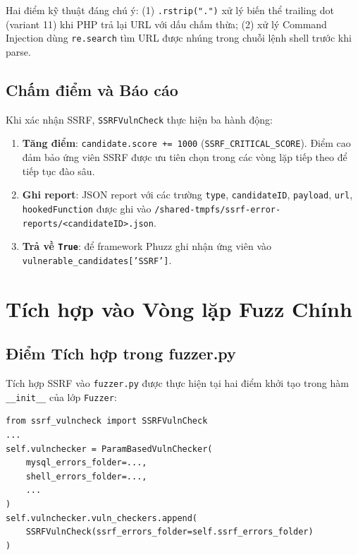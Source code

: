 Hai điểm kỹ thuật đáng chú ý: (1) \texttt{.rstrip(".")} xử lý biến thể
trailing dot (variant 11) khi PHP trả lại URL với dấu chấm thừa; (2) xử lý
Command Injection dùng \texttt{re.search} tìm URL được nhúng trong chuỗi
lệnh shell trước khi parse.

\subsection{Chấm điểm và Báo cáo}

Khi xác nhận SSRF, \texttt{SSRFVulnCheck} thực hiện ba hành động:

\begin{enumerate}
    \item \textbf{Tăng điểm}: \texttt{candidate.score += 1000}
    (\texttt{SSRF\_CRITICAL\_SCORE}). Điểm cao đảm bảo ứng viên SSRF được
    ưu tiên chọn trong các vòng lặp tiếp theo để tiếp tục đào sâu.
    \item \textbf{Ghi report}: JSON report với các trường \texttt{type},
    \texttt{candidateID}, \texttt{payload}, \texttt{url},
    \texttt{hookedFunction} được ghi vào
    \texttt{/shared-tmpfs/ssrf-error-reports/<candidateID>.json}.
    \item \textbf{Trả về \texttt{True}}: để framework Phuzz ghi nhận
    ứng viên vào \texttt{vulnerable\_candidates['SSRF']}.
\end{enumerate}

\section{Tích hợp vào Vòng lặp Fuzz Chính}
\label{sec:integration}

\subsection{Điểm Tích hợp trong fuzzer.py}

Tích hợp SSRF vào \texttt{fuzzer.py} được thực hiện tại hai điểm khởi tạo
trong hàm \texttt{\_\_init\_\_} của lớp \texttt{Fuzzer}:

\begin{verbatim}
from ssrf_vulncheck import SSRFVulnCheck
...
self.vulnchecker = ParamBasedVulnChecker(
    mysql_errors_folder=...,
    shell_errors_folder=...,
    ...
)
self.vulnchecker.vuln_checkers.append(
    SSRFVulnCheck(ssrf_errors_folder=self.ssrf_errors_folder)
)
\end{verbatim}

